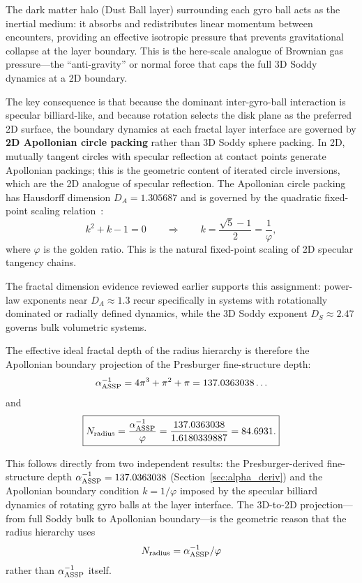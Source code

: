 \documentclass[11pt,a4paper]{article}
\begin{document}
The dark matter halo (Dust Ball layer) surrounding each gyro ball acts as the inertial medium: it absorbs and redistributes linear momentum between encounters, providing an effective isotropic pressure that prevents gravitational collapse at the layer boundary. This is the here-scale analogue of Brownian gas pressure---the ``anti-gravity'' or normal force that caps the full 3D Soddy dynamics at a 2D boundary.

The key consequence is that because the dominant inter-gyro-ball interaction is specular billiard-like, and because rotation selects the disk plane as the preferred 2D surface, the boundary dynamics at each fractal layer interface are governed by \textbf{2D Apollonian circle packing} rather than 3D Soddy sphere packing. In 2D, mutually tangent circles with specular reflection at contact points generate Apollonian packings; this is the geometric content of iterated circle inversions, which are the 2D analogue of specular reflection. The Apollonian circle packing has Hausdorff dimension \(D_A = 1.305687\) and is governed by the quadratic fixed-point scaling relation~\cite{Boyd1973,Graham2003,Manna1991}:
\[
k^2+k-1=0
\qquad\Rightarrow\qquad
k=\frac{\sqrt{5}-1}{2}=\frac{1}{\varphi},
\]
where \(\varphi\) is the golden ratio. This is the natural fixed-point scaling of 2D specular tangency chains.

The fractal dimension evidence reviewed earlier supports this assignment: power-law exponents near \(D_A\approx1.3\) recur specifically in systems with rotationally dominated or radially defined dynamics, while the 3D Soddy exponent \(D_S\approx2.47\) governs bulk volumetric systems.

The effective ideal fractal depth of the radius hierarchy is therefore the
Apollonian boundary projection of the Presburger fine-structure depth:
\[
\alpha^{-1}_{\rm ASSP}
=
4\pi^3+\pi^2+\pi
=
137.0363038\ldots
\]
and
\[
\boxed{
N_{\rm radius}
=
\frac{\alpha^{-1}_{\rm ASSP}}{\varphi}
=
\frac{137.0363038}{1.6180339887}
=
84.6931.
}
\]

This follows directly from two independent results: the Presburger-derived fine-structure depth \(\alpha^{-1}_{\rm ASSP}=137.0363038\) (Section~\ref{sec:alpha_deriv}) and the Apollonian boundary condition \(k=1/\varphi\) imposed by the specular billiard dynamics of rotating gyro balls at the layer interface. The 3D-to-2D projection---from full Soddy bulk to Apollonian boundary---is the geometric reason that the radius hierarchy uses
\[
N_{\rm radius}=\alpha^{-1}_{\rm ASSP}/\varphi
\]
rather than \(\alpha^{-1}_{\rm ASSP}\) itself.
\end{document}

